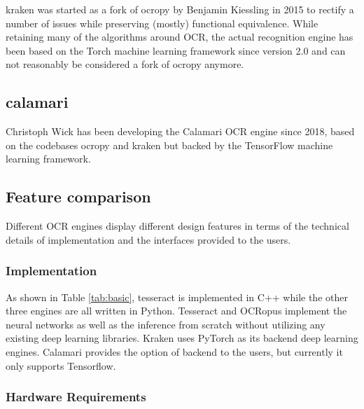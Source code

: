 \documentclass[conference]{IEEEtran}
\begin{document}
kraken \cite{DBLP:journals/corr/RomanovMSK17} was started as a fork of ocropy by Benjamin Kiessling in 2015 to rectify a number of issues while preserving (mostly) functional equivalence. While retaining many of the algorithms around OCR, the actual recognition engine has been based on the Torch machine learning framework since version 2.0 and can not reasonably be considered a fork of ocropy anymore.

\subsection*{calamari}

Christoph Wick has been developing the Calamari \cite{DBLP:journals/corr/abs-1807-02004}
OCR engine since 2018, based on the codebases ocropy and kraken but backed by the
TensorFlow machine learning framework.

\subsection*{Feature comparison}


Different OCR engines display different design features in terms of the technical details of implementation and the interfaces provided to the users. 

\subsubsection*{Implementation}

As shown in Table \ref{tab:basic}, tesseract is implemented in C++ while the  
other three engines are all written in Python. Tesseract and OCRopus   
implement the neural networks as well as the inference from scratch without 
utilizing any existing deep learning libraries. Kraken uses PyTorch as its   
backend deep learning engines. Calamari provides the option of backend to the
users, but currently it only supports Tensorflow.                            

\subsubsection*{Hardware Requirements}
\end{document}
